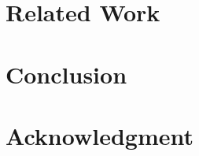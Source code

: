 \documentclass[conference]{IEEEtran}
\begin{document}

\section{Related Work}


\section{Conclusion}


\section*{Acknowledgment}



\end{document}
